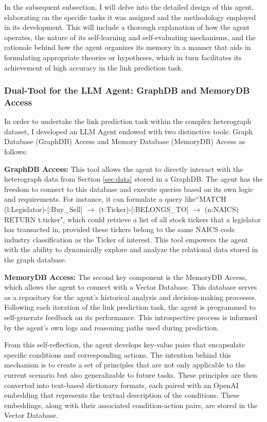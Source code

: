 \documentclass[15pt,letterpaper]{article}
\begin{document}
In the subsequent subsection, 
I will delve into the detailed design of this agent, elaborating on the specific tasks it was assigned and the methodology employed in its development. 
This will include a thorough explanation of how the agent operates, 
the nature of its self-learning and self-evaluating mechanisms, and the 
rationale behind how the agent organizes its memory in a manner that 
aids in formulating appropriate theories or hypotheses, 
which in turn facilitates its achievement of high accuracy in the link prediction task.


\subsubsection{Dual-Tool for the LLM Agent: GraphDB and MemoryDB Access}

In order to undertake the link prediction task within the complex heterograph dataset, I developed an LLM Agent endowed with two distinctive tools: Graph Database (GraphDB) Access and Memory Database (MemoryDB) Access as follows: 

\textbf{GraphDB Access:} This tool allows the agent to directly interact with the heterograph data from Section \ref{sec:data} stored in a GraphDB. The agent has the freedom to connect to this database and execute queries based on its own logic and requirements. For instance, it can formulate a query like``MATCH (l:Legislator)-[:Buy\_Sell] $\rightarrow$ (t:Ticker)-[:BELONGS\_TO] $\rightarrow$ (n:NAICS) 
RETURN t.ticker", which could retrieve a list of all stock tickers that a legislator has transacted in, provided these tickers belong to the same NAICS code industry classification as the Ticker of interest. This tool empowers the agent with the ability to dynamically explore and analyze the relational data stored in the graph database.

\textbf{MemoryDB Access:} The second key component is the MemoryDB Access, which allows the agent to connect with a Vector Database. This database serves as a repository for the agent's historical analysis and decision-making processes. Following each iteration of the link prediction task, the agent is programmed to self-generate feedback on its performance. This introspective process is informed by the agent's own logs and reasoning paths used during prediction.

From this self-reflection, the agent develops key-value pairs that encapsulate specific conditions and corresponding actions. The intention behind this mechanism is to create a set of principles that are not only applicable to the current scenario but also generalizable to future tasks. These principles are then converted into text-based dictionary formats, each paired with an OpenAI embedding that represents the textual description of the conditions. These embeddings, along with their associated condition-action pairs, are stored in the Vector Database.
\end{document}
